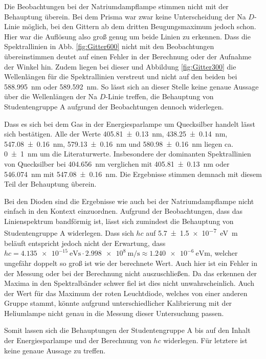 	Die Beobachtungen bei der Natriumdampflampe stimmen nicht mit der Behauptung überein.
	Bei dem Prisma war zwar keine Unterscheidung der Na $D$-Linie möglich, bei den Gittern ab dem dritten Beugungsmaximum jedoch schon.
	Hier war die Auflösung also groß genug um beide Linien zu erkennen.
	Dass die Spektrallinien in Abb. \ref{fig:Gitter600} nicht mit den Beobachtungen übereinstimmen deutet auf einen Fehler in der Berechnung oder der Aufnahme der Winkel hin.
	Zudem liegen bei dieser und Abbildung \ref{fig:Gitter300} die Wellenlängen für die Spektrallinien verstreut und nicht auf den beiden bei \SI{588.995}{\nano\meter} oder \SI{589.592}{\nano\meter}\cite{NISTNa}.
	So lässt sich an dieser Stelle keine genaue Aussage über die Wellenlängen der Na $D$-Linie treffen, die Behauptung von Studentengruppe A aufgrund der Beobachtungen dennoch widerlegen.
	
	Dass es sich bei dem Gas in der Energiesparlampe um Quecksilber handelt lässt sich bestätigen.
	Alle der Werte \SI{405.81+-0.13}{\nano\meter}, \SI{438.25+-0.14}{\nano\meter}, \SI{547.08+-0.16}{\nano\meter}, \SI{579.13+-0.16}{\nano\meter} und \SI{580.98+-0.16}{\nano\meter} liegen ca. \SI{0+-1}{\nano\meter} um die Literaturwerte\cite{NISTHg}.
	Insbesondere der dominanten Spektrallinien von Quecksilber bei \SI{404.656}{\nano\meter}\cite{NISTHg} verglichen mit \SI{405.81+-0.13}{\nano\meter} oder \SI{546.074}{\nano\meter}\cite{NISTHg} mit \SI{547.08+-0.16}{\nano\meter}.
	Die Ergebnisse stimmen demnach mit diesem Teil der Behauptung überein.
	
	Bei den Dioden sind die Ergebnisse wie auch bei der Natriumdampflampe nicht einfach in den Kontext einzuordnen.
	Aufgrund der Beobachtungen, dass das Linienspektrum bandförmig ist, lässt sich zumindest die Behauptung von Studentengruppe A widerlegen.
	Dass sich $hc$ auf \SI{5,7+-1,5e-7}{\electronvolt\meter} beläuft entspricht jedoch nicht der Erwartung, dass $hc = \SI{4.135e-15}{\electronvolt\second} \cdot \SI{2,998e8}{\meter\per\second} \approx \SI{1,240e-6}{\electronvolt\meter}$\cite{NIST}, welcher ungefähr doppelt so groß ist wie der berechnete Wert.
	Auch hier ist ein Fehler in der Messung oder bei der Berechnung nicht auszuschließen.
	Da das erkennen der Maxima in den Spektralbänder schwer fiel ist dies nicht unwahrscheinlich.
	Auch der Wert für das Maximum der roten Leuchtdiode, welches von einer anderen Gruppe stammt, könnte aufgrund unterschiedlicher Kalibrierung mit der Heliumlampe nicht genau in die Messung dieser Untersuchung passen.
	
	Somit lassen sich die Behauptungen der Studentengruppe A bis auf den Inhalt der Energiesparlampe und der Berechnung von $hc$ widerlegen.
	Für letztere ist keine genaue Aussage zu treffen.